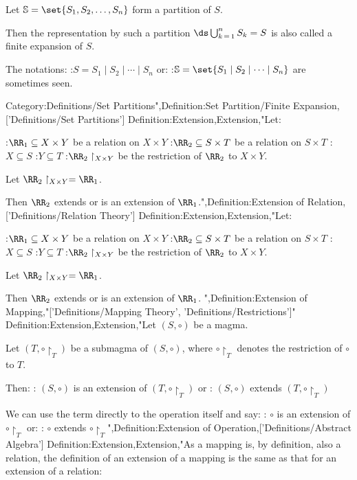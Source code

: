 Let $\Bbb S = \set {S_1, S_2, \ldots, S_n}$ form a partition of $S$.


Then the representation by such a partition $\ds \bigcup_{k \mathop = 1}^n S_k = S$ is also called a finite expansion of $S$.


The notations:
:$S = S_1 \mid S_2 \mid \cdots \mid S_n$
or:
:$\Bbb S = \set {S_1 \mid S_2 \mid \cdots \mid S_n}$
are sometimes seen.


Category:Definitions/Set Partitions",Definition:Set Partition/Finite Expansion,['Definitions/Set Partitions']
Definition:Extension,Extension,"Let:

:$\RR_1 \subseteq X \times Y$ be a relation on $X \times Y$
:$\RR_2 \subseteq S \times T$ be a relation on $S \times T$
:$X \subseteq S$
:$Y \subseteq T$
:$\RR_2 \restriction_{X \times Y}$ be the restriction of $\RR_2$ to $X \times Y$.


Let $\RR_2 \restriction_{X \times Y} = \RR_1$.


Then $\RR_2$ extends or is an extension of $\RR_1$.",Definition:Extension of Relation,['Definitions/Relation Theory']
Definition:Extension,Extension,"Let:

:$\RR_1 \subseteq X \times Y$ be a relation on $X \times Y$
:$\RR_2 \subseteq S \times T$ be a relation on $S \times T$
:$X \subseteq S$
:$Y \subseteq T$
:$\RR_2 \restriction_{X \times Y}$ be the restriction of $\RR_2$ to $X \times Y$.


Let $\RR_2 \restriction_{X \times Y} = \RR_1$.


Then $\RR_2$ extends or is an extension of $\RR_1$.
",Definition:Extension of Mapping,"['Definitions/Mapping Theory', 'Definitions/Restrictions']"
Definition:Extension,Extension,"Let $\left({S, \circ}\right)$ be a magma.

Let $\left({T, \circ \restriction_T}\right)$ be a submagma of $\left({S, \circ}\right)$, where $\circ \restriction_T$ denotes the restriction of $\circ$ to $T$.


Then:
: $\left({S, \circ}\right)$ is an extension of $\left({T, \circ \restriction_T}\right)$
or
: $\left({S, \circ}\right)$ extends $\left({T, \circ \restriction_T}\right)$


We can use the term directly to the operation itself and say:
: $\circ$ is an extension of $\circ \restriction_T$
or:
: $\circ$ extends $\circ \restriction_T$",Definition:Extension of Operation,['Definitions/Abstract Algebra']
Definition:Extension,Extension,"As a mapping is, by definition, also a relation, the definition of an extension of a mapping is the same as that for an extension of a relation:

